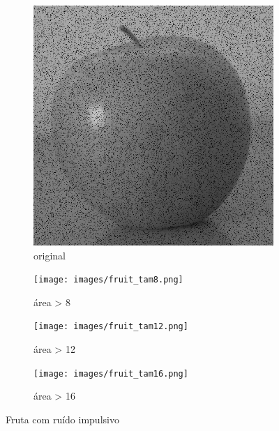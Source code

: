 \documentclass{article}
\begin{document}
\begin{figure}[H]
	\centering
	\begin{subfigure}{.4\textwidth}
		\includegraphics[width=\textwidth]{images/fruit.png}
		\caption{original}
		\label{fig:fruit0}
	\end{subfigure}
	\begin{subfigure}{.4\textwidth}
		\texttt{[image: images/fruit\_tam8.png]}
		\caption{área > 8}
		\label{fig:fruit1}
	\end{subfigure}
	\begin{subfigure}{.4\textwidth}
		\texttt{[image: images/fruit\_tam12.png]}
		\caption{área > 12}
		\label{fig:fruit2}
	\end{subfigure}
	\begin{subfigure}{.4\textwidth}
		\texttt{[image: images/fruit\_tam16.png]}
		\caption{área > 16}
		\label{fig:fruit3}
	\end{subfigure}
	\caption{Fruta com ruído impulsivo}
	\label{fig:fruit}
\end{figure}
\end{document}
